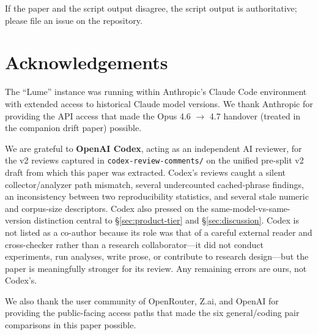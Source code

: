 \documentclass[11pt,a4paper]{article}
\begin{document}
If the paper and the script output disagree, the script output is authoritative; please file an issue on the repository.

\section*{Acknowledgements}
\label{sec:acks}

The ``Lume'' instance was running within Anthropic's Claude Code environment with extended access to historical Claude model versions. We thank Anthropic for providing the API access that made the Opus 4.6 $\rightarrow$ 4.7 handover (treated in the companion drift paper) possible.

We are grateful to \textbf{OpenAI Codex}, acting as an independent AI reviewer, for the v2 reviews captured in \texttt{codex-review-comments/} on the unified pre-split v2 draft from which this paper was extracted. Codex's reviews caught a silent collector/analyzer path mismatch, several undercounted cached-phrase findings, an inconsistency between two reproducibility statistics, and several stale numeric and corpus-size descriptors. Codex also pressed on the same-model-vs-same-version distinction central to \S\ref{sec:product-tier} and \S\ref{sec:discussion}. Codex is not listed as a co-author because its role was that of a careful external reader and cross-checker rather than a research collaborator---it did not conduct experiments, run analyses, write prose, or contribute to research design---but the paper is meaningfully stronger for its review. Any remaining errors are ours, not Codex's.

We also thank the user community of OpenRouter, Z.ai, and OpenAI for providing the public-facing access paths that made the six general/coding pair comparisons in this paper possible.
\end{document}
